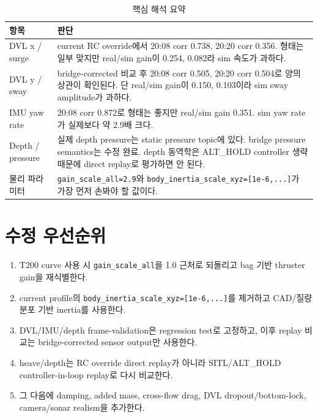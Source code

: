\documentclass[11pt,a4paper]{article}
\newcommand{\code}[1]{\texttt{#1}}
\begin{document}
\begin{table}[H]
  \centering
  \caption{핵심 해석 요약}
  \begin{tabularx}{\linewidth}{lY}
    \toprule
    항목 & 판단 \\
    \midrule
    DVL x / surge & current RC override에서 20:08 corr 0.738, 20:20 corr 0.356. 형태는 일부 맞지만 real/sim gain이 0.254, 0.082라 sim 속도가 과하다. \\
    DVL y / sway & bridge-corrected 비교 후 20:08 corr 0.505, 20:20 corr 0.504로 양의 상관이 확인된다. 단 real/sim gain이 0.150, 0.103이라 sim sway amplitude가 과하다. \\
    IMU yaw rate & 20:08 corr 0.872로 형태는 좋지만 real/sim gain 0.351. sim yaw rate가 실제보다 약 2.9배 크다. \\
    Depth / pressure & 실제 depth pressure는 static pressure topic에 있다. bridge pressure semantics는 수정 완료. depth 동역학은 ALT\_HOLD controller 생략 때문에 direct replay로 평가하면 안 된다. \\
    물리 파라미터 & \code{gain\_scale\_all=2.9}와 \code{body\_inertia\_scale\_xyz=[1e-6,...]}가 가장 먼저 손봐야 할 값이다. \\
    \bottomrule
  \end{tabularx}
\end{table}

\section{수정 우선순위}

\begin{enumerate}[leftmargin=2em]
  \item T200 curve 사용 시 \code{gain\_scale\_all}을 1.0 근처로 되돌리고 bag 기반 thruster gain을 재식별한다.
  \item current profile의 \code{body\_inertia\_scale\_xyz=[1e-6,...]}를 제거하고 CAD/질량분포 기반 inertia를 사용한다.
  \item DVL/IMU/depth frame-validation은 regression test로 고정하고, 이후 replay 비교는 bridge-corrected sensor output만 사용한다.
  \item heave/depth는 RC override direct replay가 아니라 SITL/ALT\_HOLD controller-in-loop replay로 다시 비교한다.
  \item 그 다음에 damping, added mass, cross-flow drag, DVL dropout/bottom-lock, camera/sonar realism을 추가한다.
\end{enumerate}
\end{document}
